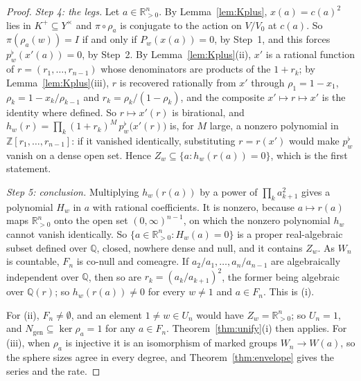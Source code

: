 \documentclass[11pt]{article}
\theoremstyle{definition}
\theoremstyle{remark}
\theoremstyle{definition}
\newcommand{\Z}{\mathbb{Z}}
\newcommand{\Q}{\mathbb{Q}}
\newcommand{\R}{\mathbb{R}}
\begin{document}
\begin{proof}
\emph{Step 4: the legs.} Let $a\in\R_{>0}^n$. By Lemma~\ref{lem:Kplus}, $x(a)=c(a)^2$ lies in
$K^+\subseteq Y^\times$ and $\pi\circ\rho_a$ is conjugate to the action on $V/V_0$ at $c(a)$. So
$\pi(\rho_a(w))=I$ if and only if $P_w(x(a))=0$, by Step~1, and this forces
$p_w^\flat(x'(a))=0$, by Step~2. By Lemma~\ref{lem:Kplus}(ii), $x'$ is a rational function of
$r=(r_1,\dots,r_{n-1})$ whose denominators are products of the $1+r_k$; by
Lemma~\ref{lem:Kplus}(iii), $r$ is recovered rationally from $x'$ through $\rho_1=1-x_1$,
$\rho_k=1-x_k/\rho_{k-1}$ and $r_k=\rho_k/(1-\rho_k)$, and the composite $x'\mapsto r\mapsto x'$
is the identity where defined. So $r\mapsto x'(r)$ is birational, and
$h_w(r)=\prod_k(1+r_k)^M\,p_w^\flat\bigl(x'(r)\bigr)$ is, for $M$ large, a nonzero polynomial in
$\Z[r_1,\dots,r_{n-1}]$: if it vanished identically, substituting $r=r(x')$ would make
$p_w^\flat$ vanish on a dense open set. Hence $Z_w\subseteq\{a:h_w(r(a))=0\}$, which is the
first statement.

\emph{Step 5: conclusion.} Multiplying $h_w(r(a))$ by a power of $\prod_ka_{k+1}^2$ gives a
polynomial $H_w$ in $a$ with rational coefficients. It is nonzero, because $a\mapsto r(a)$ maps
$\R_{>0}^n$ onto the open set $(0,\infty)^{n-1}$, on which the nonzero polynomial $h_w$ cannot
vanish identically. So $\{a\in\R_{>0}^n:H_w(a)=0\}$ is a proper real-algebraic subset defined over
$\Q$, closed, nowhere dense and null, and it contains $Z_w$. As $W_n$ is countable, $F_n$ is
co-null and comeagre. If $a_2/a_1,\dots,a_n/a_{n-1}$ are algebraically independent over $\Q$, then
so are $r_k=(a_k/a_{k+1})^2$, the former being algebraic over $\Q(r)$; so $h_w(r(a))\ne0$ for every
$w\ne1$ and $a\in F_n$. This is (i).

For (ii), $F_n\ne\emptyset$, and an element $1\ne w\in U_n$ would have $Z_w=\R_{>0}^n$; so
$U_n=1$, and $N_{\mathrm{gen}}\subseteq\ker\rho_a=1$ for any $a\in F_n$. Theorem~\ref{thm:unify}(i)
then applies. For (iii), when $\rho_a$ is injective it is an isomorphism of marked groups
$W_n\to W(a)$, so the sphere sizes agree in every degree, and Theorem~\ref{thm:envelope} gives the
series and the rate.
\end{proof}
\end{document}
